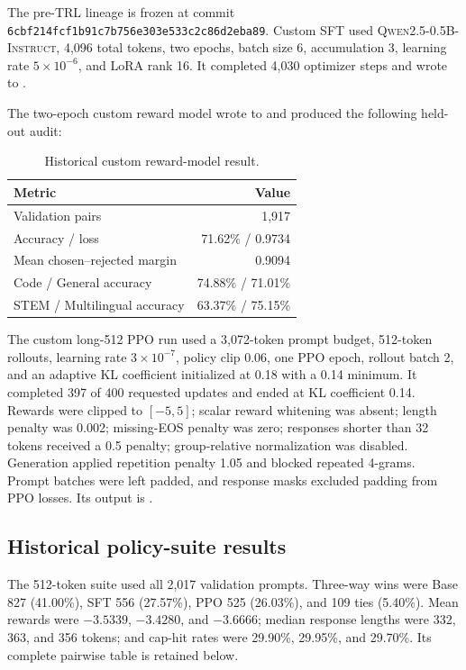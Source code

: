 \documentclass[11pt]{article}
\newcommand{\model}{\textsc{Qwen2.5-0.5B-Instruct}}
\begin{document}
The pre-TRL lineage is frozen at commit
\texttt{6cbf214fcf1b91c7b756e303e533c2c86d2eba89}. Custom SFT used
\model{}, 4,096 total tokens, two epochs, batch size 6, accumulation 3,
learning rate $5\times10^{-6}$, and LoRA rank 16. It completed 4,030 optimizer
steps and wrote to
.

The two-epoch custom reward model wrote to
 and produced the
following held-out audit:

\begin{table}[H]
\centering
\caption{Historical custom reward-model result.}
\begin{tabular}{@{}lr@{}}
\toprule
\textbf{Metric} & \textbf{Value}\\
\midrule
Validation pairs & 1,917\\
Accuracy / loss & 71.62\% / 0.9734\\
Mean chosen--rejected margin & 0.9094\\
Code / General accuracy & 74.88\% / 71.01\%\\
STEM / Multilingual accuracy & 63.37\% / 75.15\%\\
\bottomrule
\end{tabular}
\end{table}

The custom long-512 PPO run used a 3,072-token prompt budget, 512-token
rollouts, learning rate $3\times10^{-7}$, policy clip 0.06, one PPO epoch,
rollout batch 2, and an adaptive KL coefficient initialized at 0.18 with a
0.14 minimum. It completed 397 of 400 requested updates and ended at KL
coefficient 0.14. Rewards were clipped to $[-5,5]$; scalar reward whitening
was absent; length penalty was 0.002; missing-EOS penalty was zero; responses
shorter than 32 tokens received a 0.5 penalty; group-relative normalization
was disabled. Generation applied repetition penalty 1.05 and blocked repeated
4-grams. Prompt batches were left padded, and response masks excluded padding
from PPO losses. Its output is
.

\subsection{Historical policy-suite results}

The 512-token suite used all 2,017 validation prompts. Three-way wins were
Base 827 (41.00\%), SFT 556 (27.57\%), PPO 525 (26.03\%), and 109 ties
(5.40\%). Mean rewards were $-3.5339$, $-3.4280$, and $-3.6666$; median
response lengths were 332, 363, and 356 tokens; and cap-hit rates were
29.90\%, 29.95\%, and 29.70\%. Its complete pairwise table is retained below.
\end{document}
